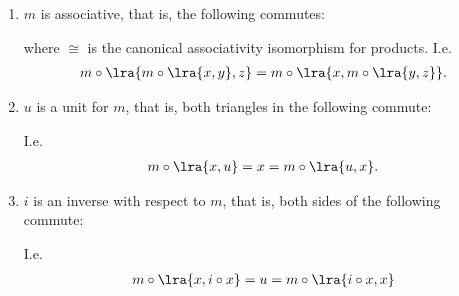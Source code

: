 \documentclass{article}
\begin{document}
\begin{definition}
    \begin{enumerate}
        \item $m$ is associative, that is, the following commutes: \begin{center}
              \end{center}
              where $\cong$ is the canonical associativity isomorphism for products. I.e. \begin{align*}
                  m\circ \lra{m\circ \lra{x,y}, z} = m\circ\lra{x,m\circ\lra{y,z}}.
              \end{align*}
        \item $u$ is a unit for $m$, that is, both triangles in the following commute: \begin{center}
              \end{center}
              I.e. \begin{align*}
                  m\circ\lra{x,u} = x = m\circ\lra{u, x}.
              \end{align*}
        \item $i$ is an inverse with respect to $m$, that is, both sides of the following commute: \begin{center}
              \end{center}
              I.e. \begin{align*}
                  m\circ\lra{x,i\circ x} = u = m\circ\lra{i\circ x, x}
              \end{align*}
    \end{enumerate}
\end{definition}
\end{document}
